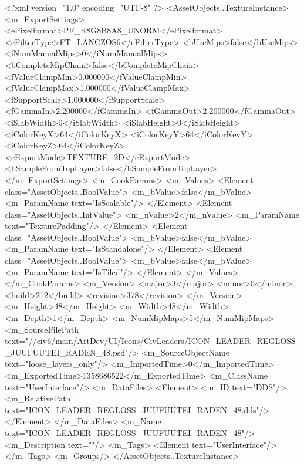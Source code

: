 <?xml version="1.0" encoding="UTF-8" ?>
<AssetObjects..TextureInstance>
	<m_ExportSettings>
		<ePixelformat>PF_R8G8B8A8_UNORM</ePixelformat>
		<eFilterType>FT_LANCZOS6</eFilterType>
		<bUseMips>false</bUseMips>
		<iNumManualMips>0</iNumManualMips>
		<bCompleteMipChain>false</bCompleteMipChain>
		<fValueClampMin>0.000000</fValueClampMin>
		<fValueClampMax>1.000000</fValueClampMax>
		<fSupportScale>1.000000</fSupportScale>
		<fGammaIn>2.200000</fGammaIn>
		<fGammaOut>2.200000</fGammaOut>
		<iSlabWidth>0</iSlabWidth>
		<iSlabHeight>0</iSlabHeight>
		<iColorKeyX>64</iColorKeyX>
		<iColorKeyY>64</iColorKeyY>
		<iColorKeyZ>64</iColorKeyZ>
		<eExportMode>TEXTURE_2D</eExportMode>
		<bSampleFromTopLayer>false</bSampleFromTopLayer>
	</m_ExportSettings>
	<m_CookParams>
		<m_Values>
			<Element class="AssetObjects..BoolValue">
				<m_bValue>false</m_bValue>
				<m_ParamName text="IsScalable"/>
			</Element>
			<Element class="AssetObjects..IntValue">
				<m_nValue>2</m_nValue>
				<m_ParamName text="TexturePadding"/>
			</Element>
			<Element class="AssetObjects..BoolValue">
				<m_bValue>false</m_bValue>
				<m_ParamName text="IsStandalone"/>
			</Element>
			<Element class="AssetObjects..BoolValue">
				<m_bValue>false</m_bValue>
				<m_ParamName text="IsTiled"/>
			</Element>
		</m_Values>
	</m_CookParams>
	<m_Version>
		<major>3</major>
		<minor>0</minor>
		<build>212</build>
		<revision>378</revision>
	</m_Version>
	<m_Height>48</m_Height>
	<m_Width>48</m_Width>
	<m_Depth>1</m_Depth>
	<m_NumMipMaps>5</m_NumMipMaps>
	<m_SourceFilePath text="//civ6/main/ArtDev/UI/Icons/CivLeaders/ICON_LEADER_REGLOSS_JUUFUUTEI_RADEN_48.psd"/>
	<m_SourceObjectName text="loose_layers_only"/>
	<m_ImportedTime>0</m_ImportedTime>
	<m_ExportedTime>1358686522</m_ExportedTime>
	<m_ClassName text="UserInterface"/>
	<m_DataFiles>
		<Element>
			<m_ID text="DDS"/>
			<m_RelativePath text="ICON_LEADER_REGLOSS_JUUFUUTEI_RADEN_48.dds"/>
		</Element>
	</m_DataFiles>
	<m_Name text="ICON_LEADER_REGLOSS_JUUFUUTEI_RADEN_48"/>
	<m_Description text=""/>
	<m_Tags>
		<Element text="UserInterface"/>
	</m_Tags>
	<m_Groups/>
</AssetObjects..TextureInstance>

